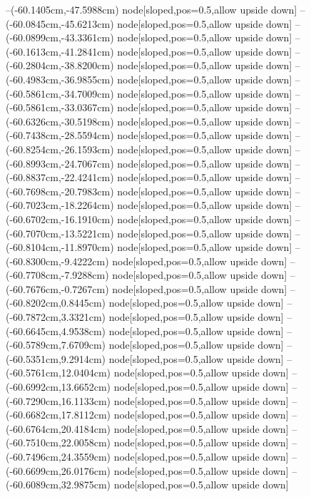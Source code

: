 --(-60.1405cm,-47.5988cm) node[sloped,pos=0.5,allow upside down]{\ArrowIn}
--(-60.0845cm,-45.6213cm) node[sloped,pos=0.5,allow upside down]{\ArrowIn}
--(-60.0899cm,-43.3361cm) node[sloped,pos=0.5,allow upside down]{\ArrowIn}
--(-60.1613cm,-41.2841cm) node[sloped,pos=0.5,allow upside down]{\ArrowIn}
--(-60.2804cm,-38.8200cm) node[sloped,pos=0.5,allow upside down]{\ArrowIn}
--(-60.4983cm,-36.9855cm) node[sloped,pos=0.5,allow upside down]{\ArrowIn}
--(-60.5861cm,-34.7009cm) node[sloped,pos=0.5,allow upside down]{\ArrowIn}
--(-60.5861cm,-33.0367cm) node[sloped,pos=0.5,allow upside down]{\ArrowIn}
--(-60.6326cm,-30.5198cm) node[sloped,pos=0.5,allow upside down]{\ArrowIn}
--(-60.7438cm,-28.5594cm) node[sloped,pos=0.5,allow upside down]{\ArrowIn}
--(-60.8254cm,-26.1593cm) node[sloped,pos=0.5,allow upside down]{\ArrowIn}
--(-60.8993cm,-24.7067cm) node[sloped,pos=0.5,allow upside down]{\ArrowIn}
--(-60.8837cm,-22.4241cm) node[sloped,pos=0.5,allow upside down]{\ArrowIn}
--(-60.7698cm,-20.7983cm) node[sloped,pos=0.5,allow upside down]{\ArrowIn}
--(-60.7023cm,-18.2264cm) node[sloped,pos=0.5,allow upside down]{\ArrowIn}
--(-60.6702cm,-16.1910cm) node[sloped,pos=0.5,allow upside down]{\ArrowIn}
--(-60.7070cm,-13.5221cm) node[sloped,pos=0.5,allow upside down]{\ArrowIn}
--(-60.8104cm,-11.8970cm) node[sloped,pos=0.5,allow upside down]{\ArrowIn}
--(-60.8300cm,-9.4222cm) node[sloped,pos=0.5,allow upside down]{\ArrowIn}
--(-60.7708cm,-7.9288cm) node[sloped,pos=0.5,allow upside down]{\ArrowIn}
--(-60.7676cm,-0.7267cm) node[sloped,pos=0.5,allow upside down]{\ArrowIn}
--(-60.8202cm,0.8445cm) node[sloped,pos=0.5,allow upside down]{\ArrowIn}
--(-60.7872cm,3.3321cm) node[sloped,pos=0.5,allow upside down]{\ArrowIn}
--(-60.6645cm,4.9538cm) node[sloped,pos=0.5,allow upside down]{\ArrowIn}
--(-60.5789cm,7.6709cm) node[sloped,pos=0.5,allow upside down]{\ArrowIn}
--(-60.5351cm,9.2914cm) node[sloped,pos=0.5,allow upside down]{\ArrowIn}
--(-60.5761cm,12.0404cm) node[sloped,pos=0.5,allow upside down]{\ArrowIn}
--(-60.6992cm,13.6652cm) node[sloped,pos=0.5,allow upside down]{\ArrowIn}
--(-60.7290cm,16.1133cm) node[sloped,pos=0.5,allow upside down]{\ArrowIn}
--(-60.6682cm,17.8112cm) node[sloped,pos=0.5,allow upside down]{\ArrowIn}
--(-60.6764cm,20.4184cm) node[sloped,pos=0.5,allow upside down]{\ArrowIn}
--(-60.7510cm,22.0058cm) node[sloped,pos=0.5,allow upside down]{\ArrowIn}
--(-60.7496cm,24.3559cm) node[sloped,pos=0.5,allow upside down]{\ArrowIn}
--(-60.6699cm,26.0176cm) node[sloped,pos=0.5,allow upside down]{\ArrowIn}
--(-60.6089cm,32.9875cm) node[sloped,pos=0.5,allow upside down]{\ArrowIn}
